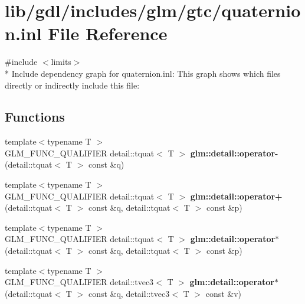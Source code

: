 \hypertarget{gtc_2quaternion_8inl}{}\section{lib/gdl/includes/glm/gtc/quaternion.inl File Reference}
\label{gtc_2quaternion_8inl}
{\ttfamily \#include $<$limits$>$}\\*
Include dependency graph for quaternion.\+inl\+:
This graph shows which files directly or indirectly include this file\+:
\subsection*{Functions}
\begin{DoxyCompactItemize}
\item 
\hypertarget{namespaceglm_1_1detail_a545892ee159f68c5d77e3b6290a745c2}{}{\footnotesize template$<$typename T $>$ }\\G\+L\+M\+\_\+\+F\+U\+N\+C\+\_\+\+Q\+U\+A\+L\+I\+F\+I\+E\+R detail\+::tquat$<$ T $>$ {\bfseries glm\+::detail\+::operator-\/} (detail\+::tquat$<$ T $>$ const \&q)\label{namespaceglm_1_1detail_a545892ee159f68c5d77e3b6290a745c2}

\item 
\hypertarget{namespaceglm_1_1detail_a807262190862c9cb8b7c08f547371831}{}{\footnotesize template$<$typename T $>$ }\\G\+L\+M\+\_\+\+F\+U\+N\+C\+\_\+\+Q\+U\+A\+L\+I\+F\+I\+E\+R detail\+::tquat$<$ T $>$ {\bfseries glm\+::detail\+::operator+} (detail\+::tquat$<$ T $>$ const \&q, detail\+::tquat$<$ T $>$ const \&p)\label{namespaceglm_1_1detail_a807262190862c9cb8b7c08f547371831}

\item 
\hypertarget{namespaceglm_1_1detail_a74d820bafaf78ba2185f70dccc368036}{}{\footnotesize template$<$typename T $>$ }\\G\+L\+M\+\_\+\+F\+U\+N\+C\+\_\+\+Q\+U\+A\+L\+I\+F\+I\+E\+R detail\+::tquat$<$ T $>$ {\bfseries glm\+::detail\+::operator$\ast$} (detail\+::tquat$<$ T $>$ const \&q, detail\+::tquat$<$ T $>$ const \&p)\label{namespaceglm_1_1detail_a74d820bafaf78ba2185f70dccc368036}

\item 
\hypertarget{namespaceglm_1_1detail_a4c95a8e1aece02bfd9cca3f937c95258}{}{\footnotesize template$<$typename T $>$ }\\G\+L\+M\+\_\+\+F\+U\+N\+C\+\_\+\+Q\+U\+A\+L\+I\+F\+I\+E\+R detail\+::tvec3$<$ T $>$ {\bfseries glm\+::detail\+::operator$\ast$} (detail\+::tquat$<$ T $>$ const \&q, detail\+::tvec3$<$ T $>$ const \&v)\label{namespaceglm_1_1detail_a4c95a8e1aece02bfd9cca3f937c95258}


\end{DoxyCompactItemize}
